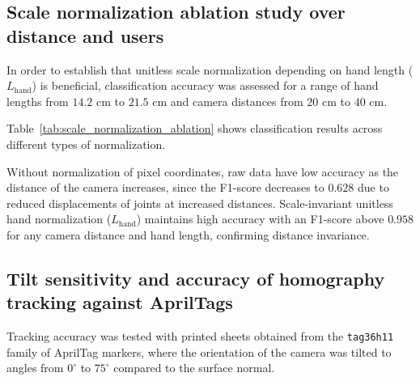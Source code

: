 \subsection{Scale normalization ablation study over distance and users}
\label{subsec:test_scale_ablation}
In order to establish that unitless scale normalization depending on hand length ($L_{\text{hand}}$) is beneficial, classification accuracy was assessed for a range of hand lengths from $14.2\text{ cm}$ to $21.5\text{ cm}$ and camera distances from $20\text{ cm}$ to $40\text{ cm}$.

Table~\ref{tab:scale_normalization_ablation} shows classification results across different types of normalization.

\begin{table}[htbp]
\centering
\caption{Ablation evaluation of feature normalization across camera distances and hand sizes.}
\label{tab:scale_normalization_ablation}
\end{table}

Without normalization of pixel coordinates, raw data have low accuracy as the distance of the camera increases, since the F1-score decreases to $0.628$ due to reduced displacements of joints at increased distances. Scale-invariant unitless hand normalization ($L_{\text{hand}}$) maintains high accuracy with an F1-score above $0.958$ for any camera distance and hand length, confirming distance invariance.

\subsection{Tilt sensitivity and accuracy of homography tracking against AprilTags}
\label{subsec:test_homography_tilt}
Tracking accuracy was tested with printed sheets obtained from the \texttt{tag36h11} family of AprilTag markers, where the orientation of the camera was tilted to angles from $0^\circ$ to $75^\circ$ compared to the surface normal.

